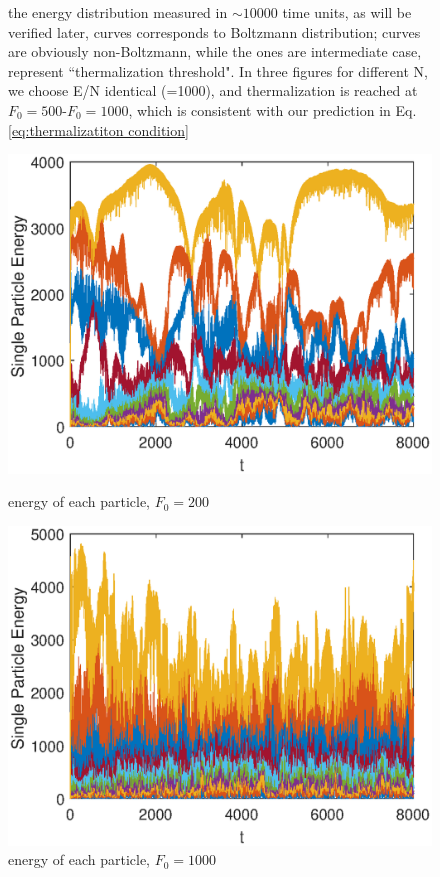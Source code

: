 \documentclass[aps,pre,twocolumn,groupedaddress]{revtex4-1}
\begin{document}
\begin{figure}[hbtp]
\caption{the energy distribution measured in $\sim 10000$ time units, as will be verified later, {\color{green}{green}} curves corresponds to Boltzmann distribution; {\color{red}{red}} curves are obviously non-Boltzmann, while the {\color{yellow}{yellow}} ones are intermediate case, represent ``thermalization threshold". In three figures for different N, we choose E/N identical (=1000), and thermalization is reached at $F_0=500$-$F_0=1000$, which is consistent with our prediction in Eq.\ref{eq:thermalizatiton condition}}
\label{fig:thermalization5}

\end{figure}

\begin{figure}
\includegraphics[scale=0.6]{ZhiyuPictures/10_23_N=10_single_particle_energy_F0=200_pre.eps} 
\caption{energy of each particle, $F_0=200$}
\label{fig:thermalization6}

\includegraphics[scale=0.6]{ZhiyuPictures/10_23_N=10_single_particle_energy_F0=1000_pre.eps} 
\caption{energy of each particle, $F_0=1000$}
\label{fig:thermalization7}
\end{figure}
\end{document}
